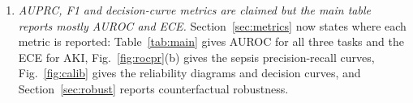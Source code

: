 \documentclass[conference]{IEEEtran}
\begin{document}
\begin{enumerate}
\item \textit{AUPRC, F1 and decision-curve metrics are claimed but the main table reports mostly AUROC and ECE.} Section~\ref{sec:metrics} now states where each metric is reported: Table~\ref{tab:main} gives AUROC for all three tasks and the ECE for AKI, Fig.~\ref{fig:rocpr}(b) gives the sepsis precision-recall curves, Fig.~\ref{fig:calib} gives the reliability diagrams and decision curves, and Section~\ref{sec:robust} reports counterfactual robustness.
\end{enumerate}
\end{document}
